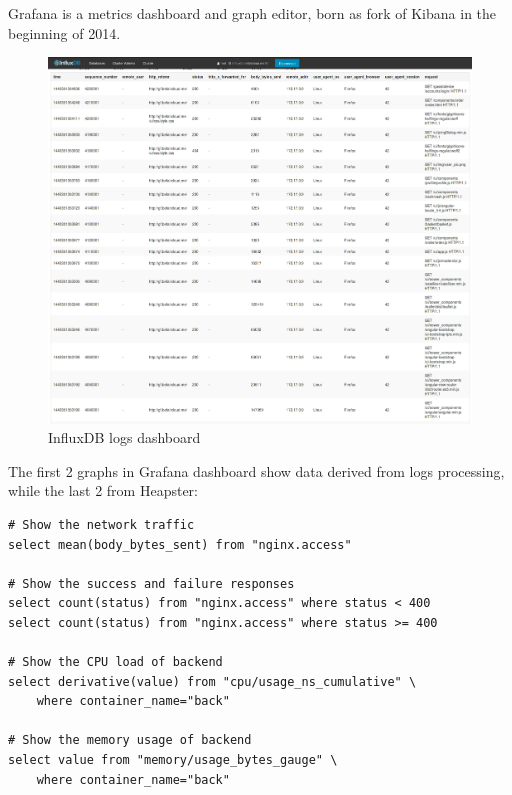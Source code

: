 Grafana is a metrics dashboard and graph editor, born as fork of Kibana in the beginning of 2014.

\begin{figure}[htbp]
\centering
\includegraphics{media/ch6-influxdb.png}
\caption{InfluxDB logs dashboard}
\end{figure}

The first 2 graphs in Grafana dashboard show data derived from logs processing, while the last 2 from Heapster:

\begin{verbatim}
# Show the network traffic
select mean(body_bytes_sent) from "nginx.access"

# Show the success and failure responses
select count(status) from "nginx.access" where status < 400
select count(status) from "nginx.access" where status >= 400

# Show the CPU load of backend
select derivative(value) from "cpu/usage_ns_cumulative" \
    where container_name="back"

# Show the memory usage of backend
select value from "memory/usage_bytes_gauge" \
    where container_name="back"
\end{verbatim}

